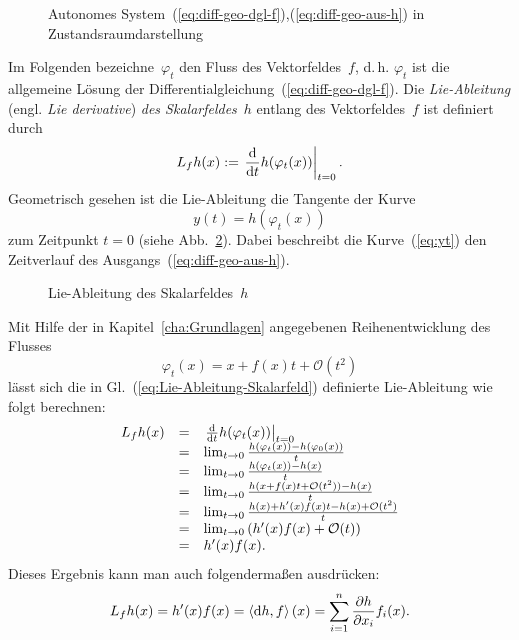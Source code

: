 \begin{figure}
\begin{centering}
\resizebox{0.7\textwidth}{!}{}
\par\end{centering}
\caption{Autonomes System~(\ref{eq:diff-geo-dgl-f}),(\ref{eq:diff-geo-aus-h})
in Zustandsraumdarstellung\label{fig:diff-geo-automones-system}}
\end{figure}

Im Folgenden bezeichne~$\varphi_{t}$ den Fluss des
Vektorfeldes~$f$, d.\,h. $\varphi_{t}$ ist die allgemeine Lösung
der Differentialgleichung~(\ref{eq:diff-geo-dgl-f}). Die \emph{Lie-Ableitung
}(engl.\emph{ Lie derivative})\emph{ des Skalarfeldes}~$h$
entlang des Vektorfeldes~$f$ ist definiert durch 
\begin{equation}
L_{f}h(x):=\left.\frac{{\mathrm{d}}}{{\mathrm{d}} t}h(\varphi_{t}(x))\right|_{t=0}.\label{eq:Lie-Ableitung-Skalarfeld}
\end{equation}
Geometrisch gesehen ist die Lie-Ableitung die Tangente der Kurve 
\begin{equation}
y(t)=h(\varphi_{t}(x))\label{eq:yt}
\end{equation}
zum Zeitpunkt $t=0$ (siehe Abb.~\ref{fig:Lie-Ableitung-des-Skalarfeldes}).
Dabei beschreibt die Kurve~(\ref{eq:yt}) den Zeitverlauf des Ausgangs~(\ref{eq:diff-geo-aus-h}).

\begin{figure}
\begin{centering}
\resizebox{0.9\textwidth}{!}{}
\par\end{centering}
\caption{Lie-Ableitung des Skalarfeldes~$h$\label{fig:Lie-Ableitung-des-Skalarfeldes}}
\end{figure}

Mit Hilfe der in Kapitel~\ref{cha:Grundlagen} angegebenen Reihenentwicklung
des Flusses 
\[
\varphi_{t}(x)=x+f(x)t+\mathcal{O}(t^{2})
\]
lässt sich die in Gl.~(\ref{eq:Lie-Ableitung-Skalarfeld}) definierte
Lie-Ableitung wie folgt berechnen: 
\[
\begin{array}{ccl}
L_{f}h(x) & = & \left.\frac{{\mathrm{d}}}{{\mathrm{d}} t}h(\varphi_{t}(x))\right|_{t=0}\\
 & = & \lim_{t\to0}\frac{h(\varphi_{t}(x))-h(\varphi_{0}(x))}{t}\\
 & = & \lim_{t\to0}\frac{h(\varphi_{t}(x))-h(x)}{t}\\
 & = & \lim_{t\to0}\frac{h(x+f(x)t+\mathcal{O}(t^{2}))-h(x)}{t}\\
 & = & \lim_{t\to0}\frac{h(x)+h^{\prime}(x)f(x)t-h(x)+\mathcal{O}(t^{2})}{t}\\
 & = & \lim_{t\to0}\left(h^{\prime}(x)f(x)+\mathcal{O}(t)\right)\\
 & = & h^{\prime}(x)f(x).
\end{array}
\]
Dieses Ergebnis kann man auch folgendermaßen ausdrücken: 
\begin{equation}
L_{f}h(x)=h^{\prime}(x)f(x)=\left\langle {\mathrm{d}} h,f\right\rangle (x)=\sum_{i=1}^{n}\frac{\partial h}{\partial x_{i}}f_{i}(x).\label{eq:lie-scalar-expliziete-formel}
\end{equation}

